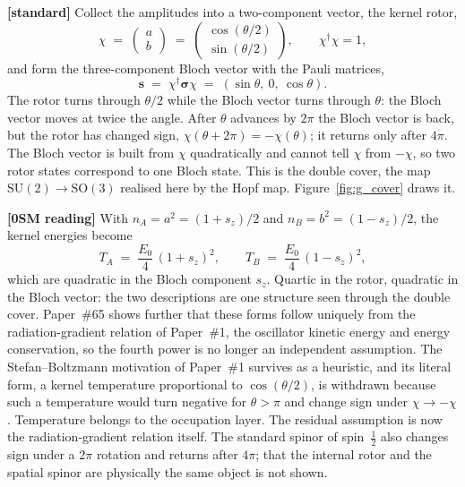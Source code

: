 \documentclass[%
 reprint, amsmath,amssymb, aps, prb, ]{revtex4-2}
\numberwithin{equation}{section}
\newcommand{\iphase}{\theta}
\begin{document}
\textbf{[standard]} Collect the amplitudes into a two-component vector, the kernel rotor,
\begin{equation}
\chi \;=\; \begin{pmatrix} a \\ b \end{pmatrix} \;=\; \begin{pmatrix} \cos(\iphase/2) \\ \sin(\iphase/2) \end{pmatrix},
\qquad \chi^{\dagger}\chi = 1,
\label{eq:g_rotor}
\end{equation}
and form the three-component Bloch vector with the Pauli matrices,
\begin{equation}
\mathbf{s} \;=\; \chi^{\dagger}\bm{\sigma}\chi \;=\; (\sin\iphase,\ 0,\ \cos\iphase).
\label{eq:g_bloch}
\end{equation}
The rotor turns through $\iphase/2$ while the Bloch vector turns through $\iphase$: the Bloch vector moves at twice the angle. After $\iphase$ advances by $2\pi$ the Bloch vector is back, but the rotor has changed sign, $\chi(\iphase + 2\pi) = -\chi(\iphase)$; it returns only after $4\pi$. The Bloch vector is built from $\chi$ quadratically and cannot tell $\chi$ from $-\chi$, so two rotor states correspond to one Bloch state. This is the double cover, the map $\mathrm{SU}(2)\to\mathrm{SO}(3)$ realised here by the Hopf map. Figure~\ref{fig:g_cover} draws it.

\textbf{[0SM reading]} With $n_A = a^{2} = (1 + s_z)/2$ and $n_B = b^{2} = (1 - s_z)/2$, the kernel energies become
\begin{equation}
T_A \;=\; \frac{E_0}{4}\,(1 + s_z)^{2}, \qquad T_B \;=\; \frac{E_0}{4}\,(1 - s_z)^{2},
\label{eq:g_TAs}
\end{equation}
which are quadratic in the Bloch component $s_z$. Quartic in the rotor, quadratic in the Bloch vector: the two descriptions are one structure seen through the double cover. Paper~\#65 shows further that these forms follow uniquely from the radiation-gradient relation of Paper~\#1, the oscillator kinetic energy and energy conservation, so the fourth power is no longer an independent assumption. The Stefan--Boltzmann motivation of Paper~\#1 survives as a heuristic, and its literal form, a kernel temperature proportional to $\cos(\iphase/2)$, is withdrawn because such a temperature would turn negative for $\iphase > \pi$ and change sign under $\chi\to-\chi$. Temperature belongs to the occupation layer. The residual assumption is now the radiation-gradient relation itself. The standard spinor of spin~$\tfrac12$ also changes sign under a $2\pi$ rotation and returns after $4\pi$; that the internal rotor and the spatial spinor are physically the same object is not shown.
\end{document}
